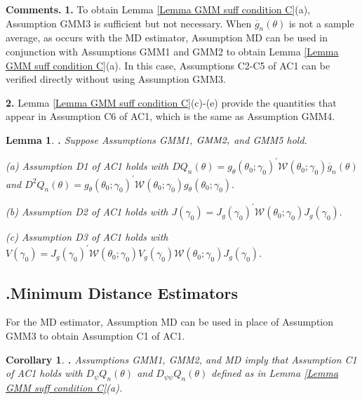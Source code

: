 \documentclass[12pt,titlepage,final,oneside,letterpaper]{article}
\newtheorem{corollary}{Corollary}[section]
\newtheorem{lemma}{Lemma}[section]
\begin{document}
\noindent \textbf{Comments.} \textbf{1.} To obtain Lemma \ref{Lemma GMM suff
condition C}(a), Assumption GMM3 is sufficient but not necessary. When $%
\overline{g}_{n}(\theta )$ is not a sample average, as occurs with the MD
estimator, Assumption MD can be used in conjunction with Assumptions GMM1
and GMM2 to obtain Lemma \ref{Lemma GMM suff condition C}(a). In this case,
Assumptions C2-C5 of AC1 can be verified directly without using Assumption
GMM3.

\textbf{2.} Lemma \ref{Lemma GMM suff condition C}(c)-(e) provide the
quantities that appear in Assumption C6 of AC1, which is the same as
Assumption GMM4.\medskip

\begin{lemma}
\textbf{\hspace{-0.08in}.} \label{Lemma GMM Sufficient D}Suppose Assumptions 
\emph{GMM1, }$\emph{GMM2,}$ and \emph{GMM5 }hold.

\noindent \emph{(a)} Assumption \emph{D1} of \emph{AC1 }holds with $%
DQ_{n}(\theta )=g_{\theta }(\theta _{0};\gamma _{0})^{\prime }\mathcal{W}%
(\theta _{0};\gamma _{0})\overline{g}_{n}(\theta )$ and \newline
$D^{2}Q_{n}(\theta )=g_{\theta }(\theta _{0};\gamma _{0})^{\prime }\mathcal{W%
}(\theta _{0};\gamma _{0})g_{\theta }(\theta _{0};\gamma _{0}).$

\noindent \emph{(b)} Assumption \emph{D2} of \emph{AC1 }holds with $J(\gamma
_{0})=J_{g}(\gamma _{0})^{\prime }\mathcal{W}(\theta _{0};\gamma
_{0})J_{g}\left( \gamma _{0}\right) .$

\noindent \emph{(c)} Assumption \emph{D3} of \emph{AC1 }holds with $V(\gamma
_{0})=J_{g}(\gamma _{0})^{\prime }\mathcal{W}(\theta _{0};\gamma
_{0})V_{g}\left( \gamma _{0}\right) \mathcal{W}(\theta _{0};\gamma
_{0})J_{g}\left( \gamma _{0}\right) .$
\end{lemma}

\subsection{\hspace{-0.23in}\textbf{.}\hspace{0.18in}Minimum Distance
Estimators}

\hspace{0.25in}For the MD estimator, Assumption MD can be used in place of
Assumption GMM3 to obtain Assumption C1 of AC1.

\begin{corollary}
\textbf{\hspace{-0.08in}.} \label{Corollary MD}Assumptions \emph{GMM1,} 
\emph{GMM2,} and \emph{MD} imply that Assumption \emph{C1} of \emph{AC1 }%
holds with $D_{\psi }Q_{n}(\theta )$ and $D_{\psi \psi }Q_{n}(\theta )$
defined as in Lemma \emph{\ref{Lemma GMM suff condition C}(a).}
\end{corollary}
\end{document}
